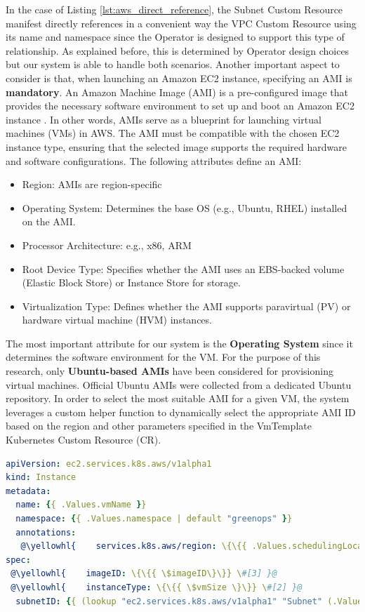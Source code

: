 In the case of Listing \ref{lst:aws_direct_reference}, the Subnet Custom Resource manifest directly references in a convenient way the VPC Custom Resource using its name and namespace since the Operator is designed to support this type of relationship. As explained before, this is determined by Operator design choices but our system is able to handle both scenarios.
\newline
Another important aspect to consider is that, when launching an Amazon EC2 instance, specifying an AMI is \textbf{mandatory}. 
An Amazon Machine Image (AMI) is a pre-configured image that provides the necessary software environment to set up and boot an Amazon EC2 instance \cite{aws_AMIs}. 
In other words, AMIs serve as a blueprint for launching virtual machines (VMs) in AWS.
The AMI must be compatible with the chosen EC2 instance type, ensuring that the selected image supports the required hardware and software configurations.
The following attributes define an AMI:
\begin{itemize}[itemsep=0.2pt, topsep=1pt] 
  \item[$\bullet$] Region: AMIs are region-specific
  \item[$\bullet$] Operating System: Determines the base OS (e.g., Ubuntu, RHEL) installed on the AMI.
  \item[$\bullet$] Processor Architecture: e.g., x86, ARM
  \item[$\bullet$] Root Device Type: Specifies whether the AMI uses an EBS-backed volume (Elastic Block Store) or Instance Store for storage.
  \item[$\bullet$] Virtualization Type: Defines whether the AMI supports paravirtual (PV) or hardware virtual machine (HVM) instances.
\end{itemize}

The most important attribute for our system is the \textbf{Operating System} since it determines the software environment for the VM.
For the purpose of this research, only \textbf{Ubuntu-based AMIs} have been considered for provisioning virtual machines. Official Ubuntu AMIs were collected from a dedicated Ubuntu repository.
In order to select the most suitable AMI for a given VM, the system leverages a custom helper function to dynamically select the appropriate AMI ID based on the region and other parameters specified in the VmTemplate Kubernetes Custom Resource (CR).

\begin{lstlisting}[language=yaml, caption={AWS}, label={lst:aws}]
apiVersion: ec2.services.k8s.aws/v1alpha1
kind: Instance
metadata:
  name: {{ .Values.vmName }}
  namespace: {{ .Values.namespace | default "greenops" }}
  annotations:
   @\yellowhl{    services.k8s.aws/region: \{\{{ .Values.schedulingLocation \}\}} \#[1] }@
spec:
 @\yellowhl{    imageID: \{\{{ \$imageID\}\}} \#[3] }@
 @\yellowhl{    instanceType: \{\{{ \$vmSize \}\}} \#[2] }@
  subnetID: {{ (lookup "ec2.services.k8s.aws/v1alpha1" "Subnet" (.Values.namespace | default "greenops") (printf "%s-subnet" .Values.vmName)).status.subnetID }}
\end{lstlisting}

